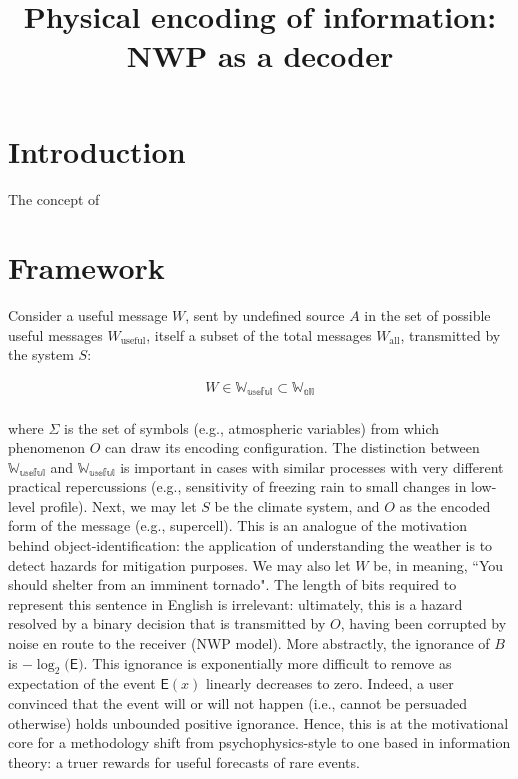 \documentclass{ametsoc}
\title{Physical encoding of information: NWP as a decoder}
\affiliation{Cooperative for Mesoscale Meteorological Studies, University of Oklahoma, Norman, OK\\NOAA/OAR/National Severe Storms Laboratory, Norman, OK}
\newcommand*{\expect}{\mathsf{E}}
\begin{document}
\maketitle


%
\section{Introduction}
The concept of 



\section{Framework}
Consider a useful message $W$, sent by undefined source $A$ in the set of possible useful messages $W_\textrm{useful}$, itself a subset of the total messages $W_\textrm{all}$, transmitted by the system $S$:

\begin{align}
    W \in \mathbb{W_\textrm{useful}} \subset \mathbb{W_\textrm{all}}  \\
\end{align}

where $\Sigma$ is the set of symbols (e.g., atmospheric variables) from which phenomenon $O$ can draw its encoding configuration. The distinction between $\mathbb{W_{\textrm{useful}}}$ and $\mathbb{W_\textrm{useful}}$ is important in cases with similar processes with very different practical repercussions (e.g., sensitivity of freezing rain to small changes in low-level profile). Next, we may let $S$ be the climate system, and $O$ as the encoded form of the message (e.g., supercell). This is an analogue of the motivation behind object-identification: the application of understanding the weather is to detect hazards for mitigation purposes. We may also let $W$ be, in meaning, ``You should shelter from an imminent tornado". The length of bits required to represent this sentence in English is irrelevant: ultimately, this is a hazard resolved by a binary decision that is transmitted by $O$, having been corrupted by noise en route to the receiver (NWP model). More abstractly, the ignorance of $B$ is $-\log_2\big( \expect \big)$. This ignorance is exponentially more difficult to remove as expectation of the event $\expect(x)$ linearly decreases to zero. Indeed, a user convinced that the event will or will not happen (i.e., cannot be persuaded otherwise) holds unbounded positive ignorance. Hence, this is at the motivational core for a methodology shift from psychophysics-style to one based in information theory: a truer rewards for useful forecasts of rare events. 
\end{document}
